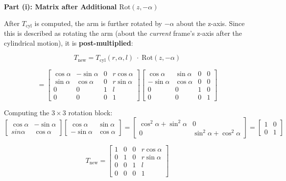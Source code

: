 \documentclass[12pt,a3paper]{article}
\begin{document}
\begin{enumerate}
\begin{tcolorbox}[enhanced,breakable,ansbox,colback=cC!4,colframe=cC,
  boxrule=0.8pt,arc=5pt,
  title={\textbf{Answer}},fonttitle=\bfseries\color{white},colbacktitle=cC]
\textbf{Part (i): Matrix after Additional $\mathrm{Rot}(z,-\alpha)$}

\medskip
After $T_{\mathrm{cyl}}$ is computed, the arm is further rotated by
$-\alpha$ about the z-axis. Since this is described as rotating the arm
(about the \emph{current} frame's z-axis after the cylindrical motion),
it is \textbf{post-multiplied}:

\[
  T_{\mathrm{new}} = T_{\mathrm{cyl}}(r,\alpha,l)\;\cdot\;\mathrm{Rot}(z,-\alpha)
\]

\[
  = \begin{bmatrix}
      \cos\alpha & -\sin\alpha & 0 & r\cos\alpha \\
      \sin\alpha &  \cos\alpha & 0 & r\sin\alpha \\
      0          &  0          & 1 & l           \\
      0          &  0          & 0 & 1
    \end{bmatrix}
    \begin{bmatrix}
      \cos\alpha  & \sin\alpha & 0 & 0 \\
     -\sin\alpha  & \cos\alpha & 0 & 0 \\
      0           & 0          & 1 & 0 \\
      0           & 0          & 0 & 1
    \end{bmatrix}
\]

Computing the $3\times3$ rotation block:
\[
  \begin{bmatrix}\cos\alpha&-\sin\alpha\\sin\alpha&\cos\alpha\end{bmatrix}
  \begin{bmatrix}\cos\alpha&\sin\alpha\\-\sin\alpha&\cos\alpha\end{bmatrix}
  = \begin{bmatrix}\cos^2\alpha+\sin^2\alpha & 0\\0 & \sin^2\alpha+\cos^2\alpha\end{bmatrix}
  = \begin{bmatrix}1&0\\0&1\end{bmatrix}
\]

\[
  \boxed{T_{\mathrm{new}} =
  \begin{bmatrix}
    1 & 0 & 0 & r\cos\alpha \\
    0 & 1 & 0 & r\sin\alpha \\
    0 & 0 & 1 & l           \\
    0 & 0 & 0 & 1
  \end{bmatrix}}
\]


\end{tcolorbox}
\end{enumerate}
\end{document}
